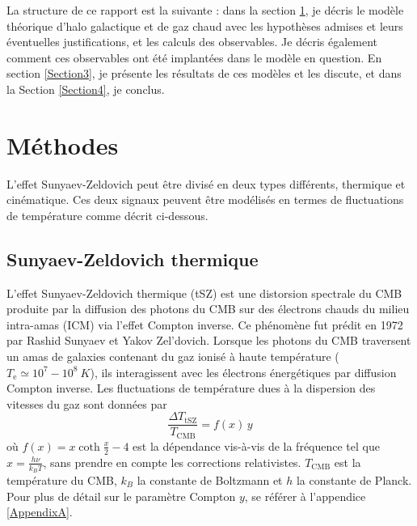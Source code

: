 \documentclass[a4paper, french, twoside, twocolumn, 11 pt]{article}
\begin{document}
La structure de ce rapport est la suivante : dans la section \ref{Section2}, je décris le modèle théorique d'halo galactique et de gaz chaud avec les hypothèses admises et leurs éventuelles justifications, et les calculs des observables. Je décris également comment ces observables ont été implantées dans le modèle en question. En section \ref{Section3}, je présente les résultats de ces modèles et les discute, et dans la Section \ref{Section4}, je conclus.
\section{Méthodes}
\label{Section2}
L'effet Sunyaev-Zeldovich peut être divisé en deux types différents, thermique et cinématique.
Ces deux signaux peuvent être modélisés en termes de fluctuations de température comme décrit ci-dessous.
\subsection{Sunyaev-Zeldovich thermique} 
L'effet Sunyaev-Zeldovich thermique (tSZ) est une distorsion spectrale du CMB produite par la diffusion des photons du CMB sur des électrons chauds du milieu intra-amas (ICM) via l'effet Compton inverse. Ce phénomène fut prédit en 1972 par Rashid Sunyaev et Yakov Zel'dovich. Lorsque les photons du CMB traversent un amas de galaxies contenant du gaz ionisé à haute température ($T_\text{e}\simeq10^7-10^8\ \unit{K}$), ils interagissent avec les électrons énergétiques par diffusion Compton inverse.
Les fluctuations de température dues à la dispersion des vitesses du gaz sont données par
\begin{equation}
\frac{\Delta T_\text{tSZ}}{T_\text{CMB}}=f(x)\, y
\end{equation}
où $f(x) = x\coth\!\frac{x}{2}-4$ est la dépendance vis-à-vis de la fréquence tel que $x=\frac{h\nu}{k_BT}$, sans prendre en compte les corrections relativistes. $T_\text{CMB}$ est la température du CMB, $k_B$ la constante de Boltzmann et $h$ la constante de Planck. Pour plus de détail sur le paramètre Compton $y$, se référer à l'appendice \ref{AppendixA}.
\end{document}
